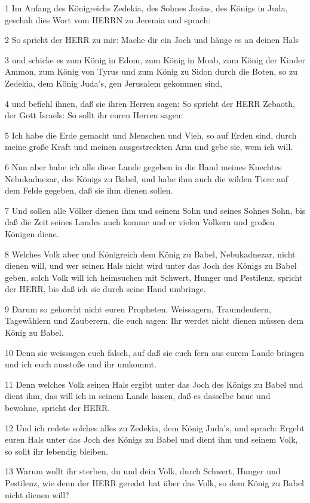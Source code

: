 \par 1 Im Anfang des Königreichs Zedekia, des Sohnes Josias, des Königs in Juda, geschah dies Wort vom HERRN zu Jeremia und sprach:
\par 2 So spricht der HERR zu mir: Mache dir ein Joch und hänge es an deinen Hals
\par 3 und schicke es zum König in Edom, zum König in Moab, zum König der Kinder Ammon, zum König von Tyrus und zum König zu Sidon durch die Boten, so zu Zedekia, dem König Juda's, gen Jerusalem gekommen sind,
\par 4 und befiehl ihnen, daß sie ihren Herren sagen: So spricht der HERR Zebaoth, der Gott Israels: So sollt ihr euren Herren sagen:
\par 5 Ich habe die Erde gemacht und Menschen und Vieh, so auf Erden sind, durch meine große Kraft und meinen ausgestreckten Arm und gebe sie, wem ich will.
\par 6 Nun aber habe ich alle diese Lande gegeben in die Hand meines Knechtes Nebukadnezar, des Königs zu Babel, und habe ihm auch die wilden Tiere auf dem Felde gegeben, daß sie ihm dienen sollen.
\par 7 Und sollen alle Völker dienen ihm und seinem Sohn und seines Sohnes Sohn, bis daß die Zeit seines Landes auch komme und er vielen Völkern und großen Königen diene.
\par 8 Welches Volk aber und Königreich dem König zu Babel, Nebukadnezar, nicht dienen will, und wer seinen Hals nicht wird unter das Joch des Königs zu Babel geben, solch Volk will ich heimsuchen mit Schwert, Hunger und Pestilenz, spricht der HERR, bis daß ich sie durch seine Hand umbringe.
\par 9 Darum so gehorcht nicht euren Propheten, Weissagern, Traumdeutern, Tagewählern und Zauberern, die euch sagen: Ihr werdet nicht dienen müssen dem König zu Babel.
\par 10 Denn sie weissagen euch falsch, auf daß sie euch fern aus eurem Lande bringen und ich euch ausstoße und ihr umkommt.
\par 11 Denn welches Volk seinen Hals ergibt unter das Joch des Königs zu Babel und dient ihm, das will ich in seinem Lande lassen, daß es dasselbe baue und bewohne, spricht der HERR.
\par 12 Und ich redete solches alles zu Zedekia, dem König Juda's, und sprach: Ergebt euren Hals unter das Joch des Königs zu Babel und dient ihm und seinem Volk, so sollt ihr lebendig bleiben.
\par 13 Warum wollt ihr sterben, du und dein Volk, durch Schwert, Hunger und Pestilenz, wie denn der HERR geredet hat über das Volk, so dem König zu Babel nicht dienen will?
